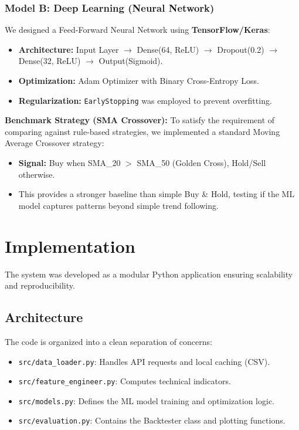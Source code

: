 \documentclass[11pt,a4paper]{article}
\begin{document}
\subsubsection{Model B: Deep Learning (Neural Network)}
We designed a Feed-Forward Neural Network using \textbf{TensorFlow/Keras}:
\begin{itemize}
    \item \textbf{Architecture:} Input Layer $\rightarrow$ Dense(64, ReLU) $\rightarrow$ Dropout(0.2) $\rightarrow$ Dense(32, ReLU) $\rightarrow$ Output(Sigmoid).
    \item \textbf{Optimization:} Adam Optimizer with Binary Cross-Entropy Loss.
    \item \textbf{Regularization:} \texttt{EarlyStopping} was employed to prevent overfitting.
\end{itemize}

\textbf{Benchmark Strategy (SMA Crossover):}
To satisfy the requirement of comparing against rule-based strategies, we implemented a standard Moving Average Crossover strategy:
\begin{itemize}
    \item \textbf{Signal:} Buy when SMA\_20 $>$ SMA\_50 (Golden Cross), Hold/Sell otherwise.
    \item This provides a stronger baseline than simple Buy \& Hold, testing if the ML model captures patterns beyond simple trend following.
\end{itemize}

\section{Implementation}
\label{sec:implementation}

The system was developed as a modular Python application ensuring scalability and reproducibility.

\subsection{Architecture}
The code is organized into a clean separation of concerns:
\begin{itemize}
    \item \texttt{src/data\_loader.py}: Handles API requests and local caching (CSV).
    \item \texttt{src/feature\_engineer.py}: Computes technical indicators.
    \item \texttt{src/models.py}: Defines the ML model training and optimization logic.
    \item \texttt{src/evaluation.py}: Contains the Backtester class and plotting functions.
\end{itemize}
\end{document}
